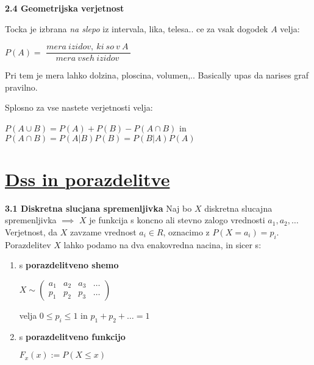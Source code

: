\documentclass{article}
\begin{document}
\begin{multicols}{3}
	\textbf{2.4 Geometrijska verjetnost}


	Tocka je izbrana \textit{na slepo} iz intervala, lika, telesa.. ce za
	vsak dogodek $A$ velja:
	\begin{center}
		\begin{math}
			P(A) =
		\end{math}
		\smallskip
		\begin{math}
			\dfrac{
				mera\: izidov,\: ki\: so\: v\: A\:
			}
			{mera\: vseh\: izidov\:}
		\end{math}
	\end{center}
	Pri tem je mera lahko dolzina, ploscina, volumen,..
	Basically upas da narises graf pravilno.

	Splosno za vse nastete verjetnosti velja:
	\begin{center}
		\begin{math}
			P(A \cup B) = P(A) + P(B) - P(A \cap B)
		\end{math} in
		\begin{math}
			P(A \cap B) = P(A | B) P(B) = P(B | A) P(A)
		\end{math}
	\end{center}

	\section{\underline{Dss in porazdelitve}}

	\textbf{3.1 Diskretna slucjana spremenljivka}
	Naj bo $X$ diskretna slucajna spremenljivka $\implies$ $X$ je funkcija
	s koncno ali stevno zalogo  vrednosti ${ a_{1}, a_{2}, \dots}$ Verjetnost,
	da $X$ zavzame vrednost $a_{i} \in R$, oznacimo z $P(X = a_{i}) = p_{i}$. Porazdelitev
	$X$ lahko podamo na dva enakovredna nacina, in sicer s:
	\begin{enumerate}
		\item s \textbf{porazdelitveno shemo}
		      \begin{center}
			      \begin{math}
				      X \sim
				      \begin{pmatrix}
					      a_{1} & a_{2} & a_{3} & \dots \\
					      p_{1} & p_{2} & p_{3} & \dots
				      \end{pmatrix}
			      \end{math}
		      \end{center}
		      velja $0 \leq p_{i} \leq 1$ in $p_{1} + p_{2} + \dots = 1$
		\item s \textbf{porazdelitveno funkcijo}
		      \begin{center}
			      \begin{math}
				      F_{x}(x) := P(X \leq x)
			      \end{math}
		      \end{center}
	\end{enumerate}


\end{multicols}
\end{document}
